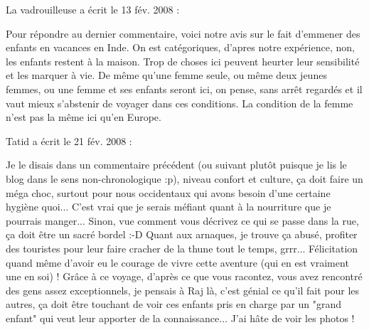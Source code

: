 \medskip
La vadrouilleuse a écrit le 13 fév. 2008 :
\begin{displayquote}
Pour répondre au dernier commentaire, voici notre avis sur le fait d'emmener des enfants en vacances en Inde. On est catégoriques, d'apres notre expérience, non, les enfants restent à la maison. Trop de choses ici peuvent heurter leur sensibilité et les marquer à vie.
De même qu'une femme seule, ou même deux jeunes femmes, ou une femme et ses enfants seront ici, on pense, sans arrêt regardés et il vaut mieux s'abstenir de voyager dans ces conditions. La condition de la femme n'est pas la même ici qu'en Europe.
\end{displayquote}

\medskip
Tatid a écrit le 21 fév. 2008 :
\begin{displayquote}
Je le disais dans un commentaire précédent (ou suivant plutôt puisque je lis le blog dans le sens non-chronologique :p), niveau confort et culture, ça doit faire un méga choc, surtout pour nous occidentaux qui avons besoin d'une certaine hygiène quoi... C'est vrai que je serais méfiant quant à la nourriture que je pourrais manger...
Sinon, vue comment vous décrivez ce qui se passe dans la rue, ça doit être un sacré bordel :-D Quant aux arnaques, je trouve ça abusé, profiter des touristes pour leur faire cracher de la thune tout le temps, grrr...
Félicitation quand même d'avoir eu le courage de vivre cette aventure (qui en est vraiment une en soi) !
Grâce à ce voyage, d'après ce que vous racontez, vous avez rencontré des gens assez exceptionnels, je pensais à Raj là, c'est génial ce qu'il fait pour les autres, ça doit être touchant de voir ces enfants pris en charge par un "grand enfant" qui veut leur apporter de la connaissance... J'ai hâte de voir les photos !
\end{displayquote}

\vfill
